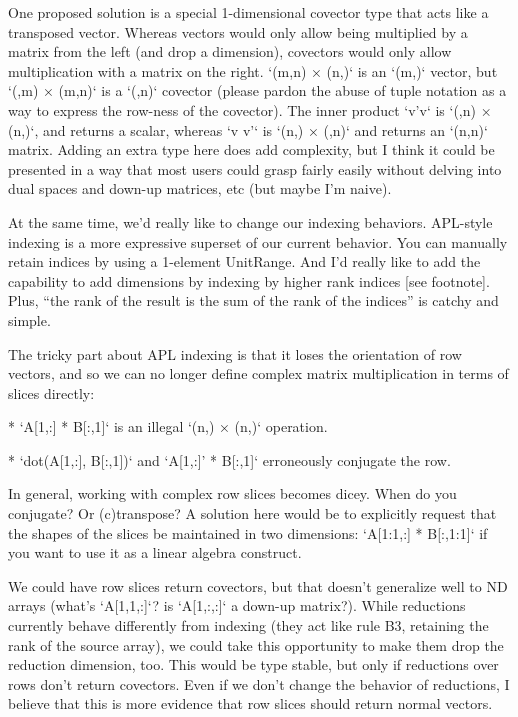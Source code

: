 One proposed solution is a special 1-dimensional covector type that acts like a
transposed vector. Whereas vectors would only allow being multiplied by a
matrix from the left (and drop a dimension), covectors would only allow
multiplication with a matrix on the right. `(m,n) × (n,)` is an `(m,)` vector,
but `(,m) × (m,n)` is a `(,n)` covector (please pardon the abuse of tuple
notation as a way to express the row-ness of the covector). The inner product
`v'v` is `(,n) × (n,)`, and returns a scalar, whereas `v v'` is `(n,) × (,n)`
and returns an `(n,n)` matrix. Adding an extra type here does add complexity,
but I think it could be presented in a way that most users could grasp fairly
easily without delving into dual spaces and down-up matrices, etc (but maybe
I'm naive).

At the same time, we'd really like to change our indexing behaviors. APL-style
indexing is a more expressive superset of our current behavior. You can
manually retain indices by using a 1-element UnitRange. And I'd really like to
add the capability to add dimensions by indexing by higher rank indices [see footnote]. Plus,
``the rank of the result is the sum of the rank of the indices'' is catchy and
simple.

The tricky part about APL indexing is that it loses the orientation of row
vectors, and so we can no longer define complex matrix multiplication in terms
of slices directly:

* `A[1,:] * B[:,1]` is an illegal `(n,) × (n,)` operation.

* `dot(A[1,:], B[:,1])` and `A[1,:]' * B[:,1]` erroneously conjugate the row.

In general, working with complex row slices becomes dicey. When do you
conjugate? Or (c)transpose? A solution here would be to explicitly request that
the shapes of the slices be maintained in two dimensions: `A[1:1,:] * B[:,1:1]`
if you want to use it as a linear algebra construct.

We could have row slices return covectors, but that doesn't generalize well to
ND arrays (what's `A[1,1,:]`? is `A[1,:,:]` a down-up matrix?). While
reductions currently behave differently from indexing (they act like rule B3,
retaining the rank of the source array), we could take this opportunity to make
them drop the reduction dimension, too. This would be type stable, but only if
reductions over rows don't return covectors. Even if we don't change the
behavior of reductions, I believe that this is more evidence that row slices
should return normal vectors.

